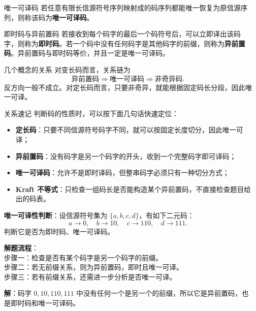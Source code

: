 \begin{definitionBox}{唯一可译码}
若任意有限长信源符号序列映射成的码序列都能唯一恢复为原信源序列，则称该码为\textbf{唯一可译码}。
\end{definitionBox}

\begin{definitionBox}{即时码与异前置码}
若接收到每个码字的最后一个码符号后，可以立即译出该码字，则称为\textbf{即时码}。若一个码中没有任何码字是其他码字的前缀，则称为\textbf{异前置码}。异前置码与即时码等价，并且一定是唯一可译码。
\end{definitionBox}

\begin{warningBox}{几个概念的关系}
对变长码而言，关系链为
\[
\text{异前置码} \Rightarrow \text{唯一可译码} \Rightarrow \text{非奇异码}.
\]
反方向一般不成立。对定长码而言，只要非奇异，就能根据固定码长分段，因此唯一可译。
\end{warningBox}

\begin{remarkBox}{关系速记}
判断码的性质时，可以按下面几句话快速定位：
\begin{itemize}
  \item \textbf{定长码}：只要不同信源符号码字不同，就可以按固定长度切分，因此唯一可译；
  \item \textbf{异前置码}：没有码字是另一个码字的开头，收到一个完整码字即可译码；
  \item \textbf{唯一可译码}：允许不是即时译码，但整串码字必须只有一种切分方式；
  \item \textbf{Kraft 不等式}：只检查一组码长是否能构造某个异前置码，不直接检查题目给出的码表。
\end{itemize}
\end{remarkBox}

\begin{example}
\label{ex:ch5-unique-decodability}
\textbf{唯一可译性判断}：设信源符号集为 $\{a,b,c,d\}$，有如下二元码：
\[
a\to0,\quad b\to10,\quad c\to110,\quad d\to111.
\]
判断它是否为即时码、唯一可译码。

\noindent \textbf{解题流程}：\\[2pt]
步骤一：检查是否有某个码字是另一个码字的前缀。\\
步骤二：若无前缀关系，则为异前置码，即时且唯一可译。\\
步骤三：若有前缀关系，还需进一步分析是否唯一可译。

\textbf{解}：码字 $0,10,110,111$ 中没有任何一个是另一个的前缀，所以它是异前置码，也是即时码和唯一可译码。
\end{example}

